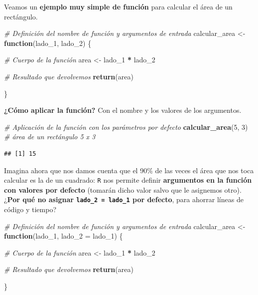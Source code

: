 \documentclass[11pt,]{book}
\newenvironment{Shaded}{\begin{snugshade}}{\end{snugshade}}
\newcommand{\CommentTok}[1]{\textcolor[rgb]{0.37,0.37,0.37}{\textit{#1}}}
\newcommand{\ControlFlowTok}[1]{\textcolor[rgb]{0.27,0.27,0.27}{\textbf{#1}}}
\newcommand{\DataTypeTok}[1]{\textcolor[rgb]{0.27,0.27,0.27}{#1}}
\newcommand{\DecValTok}[1]{\textcolor[rgb]{0.06,0.06,0.06}{#1}}
\newcommand{\KeywordTok}[1]{\textcolor[rgb]{0.27,0.27,0.27}{\textbf{#1}}}
\newcommand{\NormalTok}[1]{#1}
\newcommand{\OperatorTok}[1]{\textcolor[rgb]{0.43,0.43,0.43}{\textbf{#1}}}
\newcommand{\StringTok}[1]{\textcolor[rgb]{0.5,0.5,0.5}{#1}}
\begin{document}
Veamos un \textbf{ejemplo muy simple de función} para calcular el área de un rectángulo.

\begin{Shaded}
\begin{Highlighting}[]
\CommentTok{# Definición del nombre de función y argumentos de entrada}
\NormalTok{calcular_area <-}\StringTok{ }\ControlFlowTok{function}\NormalTok{(lado_}\DecValTok{1}\NormalTok{, lado_}\DecValTok{2}\NormalTok{) \{}
  
  \CommentTok{# Cuerpo de la función}
\NormalTok{  area <-}\StringTok{ }\NormalTok{lado_}\DecValTok{1} \OperatorTok{*}\StringTok{ }\NormalTok{lado_}\DecValTok{2}
  
  \CommentTok{# Resultado que devolvemos}
  \KeywordTok{return}\NormalTok{(area)}
  
\NormalTok{\}}
\end{Highlighting}
\end{Shaded}

\textbf{¿Cómo aplicar la función?} Con el nombre y los valores de los argumentos.

\begin{Shaded}
\begin{Highlighting}[]
\CommentTok{# Aplicación de la función con los parámetros por defecto}
\KeywordTok{calcular_area}\NormalTok{(}\DecValTok{5}\NormalTok{, }\DecValTok{3}\NormalTok{) }\CommentTok{# área de un rectángulo 5 x 3 }
\end{Highlighting}
\end{Shaded}

\begin{verbatim}
## [1] 15
\end{verbatim}

Imagina ahora que nos damos cuenta que el 90\% de las veces el área que nos toca calcular es la de un cuadrado: \texttt{R} nos permite definir \textbf{argumentos en la función con valores por defecto} (tomarán dicho valor salvo que le asignemos otro). ¿\textbf{Por qué no asignar \texttt{lado\_2\ =\ lado\_1} por defecto}, para ahorrar líneas de código y tiempo?

\begin{Shaded}
\begin{Highlighting}[]
\CommentTok{# Definición del nombre de función y argumentos de entrada}
\NormalTok{calcular_area <-}\StringTok{ }\ControlFlowTok{function}\NormalTok{(lado_}\DecValTok{1}\NormalTok{, }\DataTypeTok{lado_2 =}\NormalTok{ lado_}\DecValTok{1}\NormalTok{) \{}
  
  \CommentTok{# Cuerpo de la función}
\NormalTok{  area <-}\StringTok{ }\NormalTok{lado_}\DecValTok{1} \OperatorTok{*}\StringTok{ }\NormalTok{lado_}\DecValTok{2}
  
  \CommentTok{# Resultado que devolvemos}
  \KeywordTok{return}\NormalTok{(area)}
  
\NormalTok{\}}
\end{Highlighting}
\end{Shaded}
\end{document}
